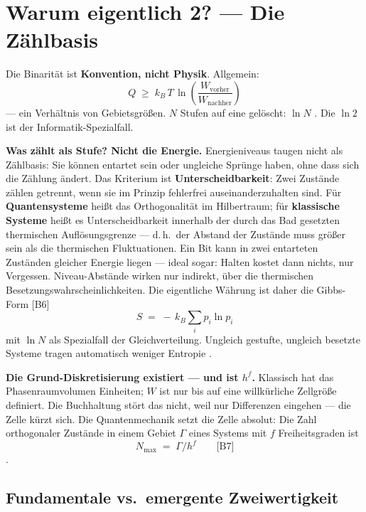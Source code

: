 \section{Warum eigentlich 2? --- Die Zählbasis}
\label{sec:zaehlbasis}

Die Binarität ist \textbf{Konvention, nicht Physik}. Allgemein:
\[
  Q \;\ge\; k_B\,T\,\ln\!\left(\frac{W_{\text{vorher}}}{W_{\text{nachher}}}\right)
\]
--- ein Verhältnis von Gebietsgrößen. $N$ Stufen auf eine gelöscht: $\ln N$
. Die $\ln 2$ ist der Informatik-Spezialfall.

\LB \textbf{Was zählt als Stufe? Nicht die Energie.} Energieniveaus taugen nicht
als Zählbasis: Sie können entartet sein oder ungleiche Sprünge haben, ohne dass
sich die Zählung ändert. Das Kriterium ist \textbf{Unterscheidbarkeit}: Zwei
Zustände zählen getrennt, wenn sie im Prinzip fehlerfrei auseinanderzuhalten sind.
Für \textbf{Quantensysteme} heißt das Orthogonalität im Hilbertraum; für
\textbf{klassische Systeme} heißt es Unterscheidbarkeit innerhalb der durch das
Bad gesetzten thermischen Auflösungsgrenze --- d.\,h.\ der Abstand der Zustände
muss größer sein als die thermischen Fluktuationen. Ein Bit kann in zwei
entarteten Zuständen gleicher Energie liegen --- ideal sogar: Halten kostet dann
nichts, nur Vergessen. Niveau-Abstände wirken nur indirekt, über die thermischen
Besetzungswahrscheinlichkeiten. Die eigentliche Währung ist daher die Gibbs-Form
[B6]
\[
  S \;=\; -\,k_B \sum_i p_i \ln p_i
\]
mit $\ln N$ als Spezialfall der Gleichverteilung. Ungleich gestufte, ungleich
besetzte Systeme tragen automatisch weniger Entropie .

\LB \textbf{Die Grund-Diskretisierung existiert --- und ist $h^f$.} Klassisch hat
das Phasenraumvolumen Einheiten; $W$ ist nur bis auf eine willkürliche Zellgröße
definiert. Die Buchhaltung stört das nicht, weil nur Differenzen eingehen --- die
Zelle kürzt sich. Die Quantenmechanik setzt die Zelle absolut: Die Zahl
orthogonaler Zustände in einem Gebiet $\Gamma$ eines Systems mit $f$
Freiheitsgraden ist
\[
  N_{\max} \;=\; \Gamma / h^f \qquad \text{[B7]}
\]
.

\subsection{Fundamentale vs.\ emergente Zweiwertigkeit}

